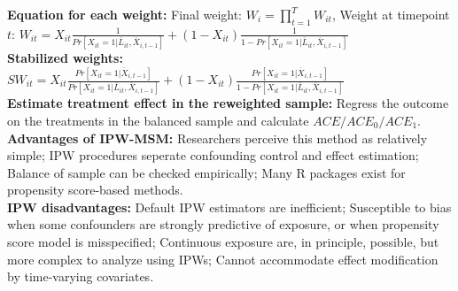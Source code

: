 \documentclass[a4paper,7pt,landscape]{extarticle}
\begin{document}
\begin{multicols}{3}
\begin{boxA}
\textbf{Equation for each weight:} Final weight: $W_i = \prod_{t=1}^T W_{it}$, Weight at timepoint $t$: $W_{it} = X_{it} \frac{1}{Pr[X_{it} = 1 | \overline{L}_{it}, \overline{X}_{i,t-1}]}+(1-X_{it}) \frac{1}{1 - Pr[X_{it} = 1 | \overline{L}_{it}, \overline{X}_{i,t-1}]}$\\
\textbf{Stabilized weights:} $SW_{it} = X_{it} \frac{Pr[X_{it} = 1 | \overline{X}_{i,t-1}]}{Pr[X_{it} = 1 | \overline{L}_{it}, \overline{X}_{i,t-1}]}+(1-X_{it}) \frac{Pr[X_{it} = 1 | \overline{X}_{i,t-1}]}{1 - Pr[X_{it} = 1 | \overline{L}_{it}, \overline{X}_{i,t-1}]}$\\
\textbf{Estimate treatment effect in the reweighted sample:} Regress the outcome on the treatments in the balanced sample and calculate $ACE/ACE_0/ACE_1$.\\
\textbf{Advantages of IPW-MSM:} Researchers perceive this method as relatively simple; IPW procedures seperate confounding control and effect estimation; Balance of sample can be checked empirically; Many R packages exist for propensity score-based methods.\\
\textbf{IPW disadvantages:} Default IPW estimators are inefficient; Susceptible to bias when some confounders are strongly predictive of exposure, or when propensity score model is misspecified; Continuous exposure are, in principle, possible, but more complex to analyze using IPWs; Cannot accommodate effect modification by time-varying covariates.

\end{boxA}


\end{multicols}
\end{document}
